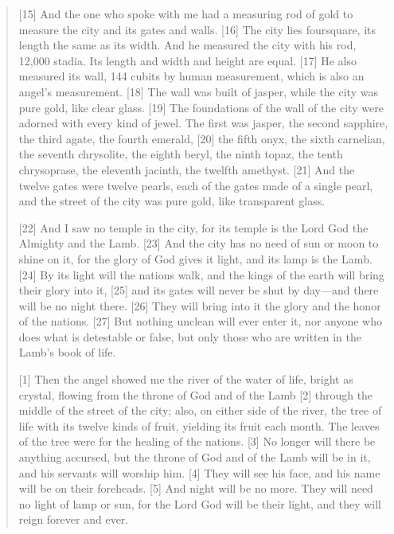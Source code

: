 \begin{quote}
    [15] And the one who spoke with me had a measuring rod of gold to measure
    the city and its gates and walls. [16] The city lies foursquare, its
    length the same as its width. And he measured the city with his rod,
    12,000 stadia. Its length and width and height are equal. [17] He also
    measured its wall, 144 cubits by human measurement, which is also an
    angel’s measurement. [18] The wall was built of jasper, while the city
    was pure gold, like clear glass. [19] The foundations of the wall of the
    city were adorned with every kind of jewel. The first was jasper, the
    second sapphire, the third agate, the fourth emerald, [20] the fifth
    onyx, the sixth carnelian, the seventh chrysolite, the eighth beryl, the
    ninth topaz, the tenth chrysoprase, the eleventh jacinth, the twelfth
    amethyst. [21] And the twelve gates were twelve pearls, each of the gates
    made of a single pearl, and the street of the city was pure gold, like
    transparent glass.

    [22] And I saw no temple in the city, for its temple is the Lord God the
    Almighty and the Lamb. [23] And the city has no need of sun or moon to
    shine on it, for the glory of God gives it light, and its lamp is the
    Lamb. [24] By its light will the nations walk, and the kings of the earth
    will bring their glory into it, [25] and its gates will never be shut by
    day—and there will be no night there. [26] They will bring into it the
    glory and the honor of the nations. [27] But nothing unclean will ever
    enter it, nor anyone who does what is detestable or false, but only those
    who are written in the Lamb’s book of life.

    [1] Then the angel showed me the river of the water of life, bright as
    crystal, flowing from the throne of God and of the Lamb [2] through the
    middle of the street of the city; also, on either side of the river, the
    tree of life with its twelve kinds of fruit, yielding its fruit each
    month. The leaves of the tree were for the healing of the nations. [3] No
    longer will there be anything accursed, but the throne of God and of the
    Lamb will be in it, and his servants will worship him. [4] They will see
    his face, and his name will be on their foreheads. [5] And night will be
    no more. They will need no light of lamp or sun, for the Lord God will be
    their light, and they will reign forever and ever.
  \end{quote}
